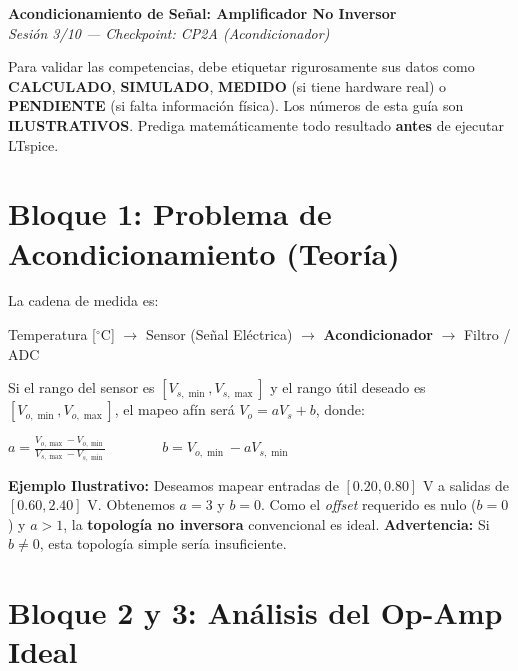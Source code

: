 \documentclass[11pt, a4paper]{article}
\begin{document}
\begin{center}
    {\Large \textbf{Acondicionamiento de Señal: Amplificador No Inversor}} \\
    \vspace{0.2cm}
    \textit{Sesión 3/10 — Checkpoint: CP2A (Acondicionador)}
\end{center}

\begin{tcolorbox}[colback=red!5, colframe=red!80!black, title=\textbf{Ruta Esencial y Trazabilidad de Evidencia}]
    Para validar las competencias, debe etiquetar rigurosamente sus datos como \textbf{CALCULADO}, \textbf{SIMULADO}, \textbf{MEDIDO} (si tiene hardware real) o \textbf{PENDIENTE} (si falta información física). Los números de esta guía son \textbf{ILUSTRATIVOS}. Prediga matemáticamente todo resultado \textbf{antes} de ejecutar LTspice.
\end{tcolorbox}

\section{Bloque 1: Problema de Acondicionamiento (Teoría)}

La cadena de medida es:
\begin{center}
    Temperatura [$^\circ$C] $\to$ Sensor (Señal Eléctrica) $\to$ \textbf{Acondicionador} $\to$ Filtro / ADC
\end{center}

Si el rango del sensor es $[V_{s,\min}, V_{s,\max}]$ y el rango útil deseado es $[V_{o,\min}, V_{o,\max}]$, el mapeo afín será $V_o = aV_s + b$, donde:

{\centering $\displaystyle a = \frac{V_{o,\max} - V_{o,\min}}{V_{s,\max} - V_{s,\min}} \qquad \qquad b = V_{o,\min} - aV_{s,\min}$ \par}

\vspace{0.3cm}
\noindent \textbf{Ejemplo Ilustrativo:} Deseamos mapear entradas de $[0.20, 0.80]$ V a salidas de $[0.60, 2.40]$ V.
Obtenemos $a=3$ y $b=0$. Como el \textit{offset} requerido es nulo ($b=0$) y $a > 1$, la \textbf{topología no inversora} convencional es ideal. \textbf{Advertencia:} Si $b \neq 0$, esta topología simple sería insuficiente.

\section{Bloque 2 y 3: Análisis del Op-Amp Ideal}
\end{document}
